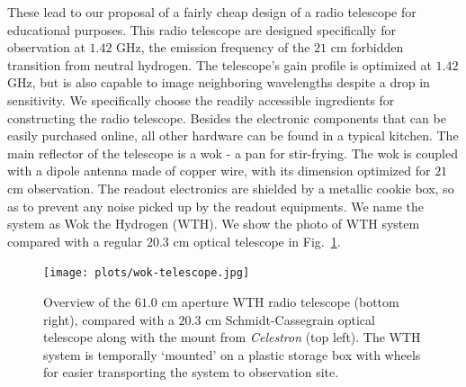 \documentclass[12pt]{article}
\begin{document}
    These lead to our proposal of a fairly cheap design of a radio telescope for educational purposes.
    This radio telescope are designed specifically for observation at $1.42$ GHz, the emission frequency of the $21$ cm forbidden transition from neutral hydrogen.
    The telescope's gain profile is optimized at $1.42$ GHz, but is also capable to image neighboring wavelengths despite a drop in sensitivity.
    We specifically choose the readily accessible ingredients for constructing the radio telescope.
    Besides the electronic components that can be easily purchased online, all other hardware can be found in a typical kitchen.
    The main reflector of the telescope is a wok - a pan for stir-frying. 
    The wok is coupled with a dipole antenna made of copper wire, with its dimension optimized for $21$ cm observation.
    The readout electronics are shielded by a metallic cookie box, so as to prevent any noise picked up by the readout equipments.
    We name the system as Wok the Hydrogen (WTH).
    We show the photo of WTH system compared with a regular $20.3$ cm optical telescope in Fig.~\ref{fig: wok-overview}.

    \begin{figure}
	    \centering
	    \texttt{[image: plots/wok-telescope.jpg]}
	    \caption{Overview of the $61.0$ cm aperture WTH radio telescope (bottom right), compared with a $20.3$ cm Schmidt-Cassegrain optical telescope along with the mount from \textit{Celestron} (top left). The WTH system is temporally `mounted' on a plastic storage box with wheels for easier transporting the system to observation site.} 
	    \label{fig: wok-overview}
	\end{figure}
\end{document}

